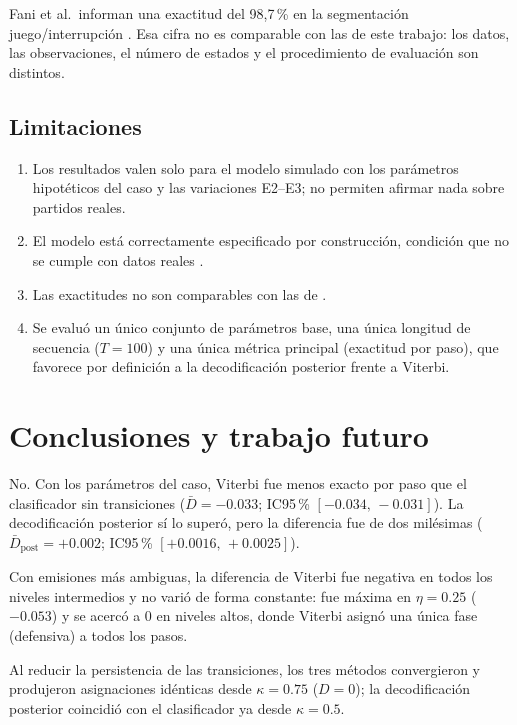 \documentclass[11pt,a4paper]{article}
\begin{document}
Fani et al.\ informan una exactitud del 98,7\,\% en la segmentación
juego/interrupción \cite[p.~27322]{fani2017}. Esa cifra no es comparable con
las de este trabajo: los datos, las observaciones, el número de estados y el
procedimiento de evaluación son distintos.

\subsection{Limitaciones}

\begin{enumerate}
\item Los resultados valen solo para el modelo simulado con los parámetros
hipotéticos del caso y las variaciones E2--E3; no permiten afirmar nada sobre
partidos reales.
\item El modelo está correctamente especificado por construcción, condición que
no se cumple con datos reales \cite[p.~23]{otting2023}.
\item Las exactitudes no son comparables con las de \cite{fani2017}.
\item Se evaluó un único conjunto de parámetros base, una única longitud de
secuencia ($T=100$) y una única métrica principal (exactitud por paso), que
favorece por definición a la decodificación posterior frente a Viterbi.
\end{enumerate}

\section{Conclusiones y trabajo futuro}\label{sec:conclusiones}

\begin{description}[leftmargin=1.2cm]
\item[P1:] No. Con los parámetros del caso, Viterbi fue menos exacto por paso
que el clasificador sin transiciones ($\bar D=-0.033$; IC95\,\%
$[-0.034,\,-0.031]$). La decodificación posterior sí lo superó, pero la
diferencia fue de dos milésimas ($\bar D_{\mathrm{post}}=+0.002$; IC95\,\%
$[+0.0016,\,+0.0025]$).
\item[P2:] Con emisiones más ambiguas, la diferencia de Viterbi fue negativa en
todos los niveles intermedios y no varió de forma constante: fue máxima en
$\eta=0.25$ ($-0.053$) y se acercó a 0 en niveles altos, donde Viterbi asignó
una única fase (defensiva) a todos los pasos.
\item[P3:] Al reducir la persistencia de las transiciones, los tres métodos
convergieron y produjeron asignaciones idénticas desde $\kappa=0.75$
($D=0$); la decodificación posterior coincidió con el clasificador ya desde
$\kappa=0.5$.
\end{description}
\end{document}

